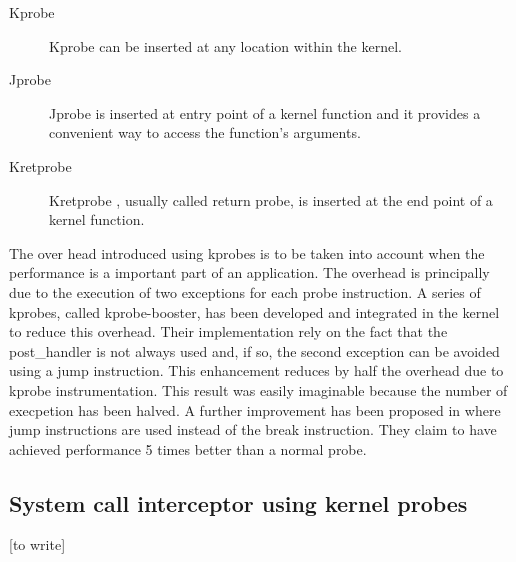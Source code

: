 \begin{description}
\item[Kprobe] Kprobe can be inserted at any location within the kernel. 
\item[Jprobe] Jprobe is inserted at entry point of a kernel function and it provides a  convenient way to access the function's arguments. 
\item[Kretprobe] Kretprobe , usually called return probe, is inserted at the end point of a kernel function.  
\end{description}
The over head introduced using kprobes is to be taken into account when the performance is a important part of an application. The overhead is principally due to the execution of two exceptions for each probe instruction. A series of kprobes, called kprobe-booster, has been developed and integrated in the kernel to reduce this overhead. Their implementation rely on the fact that the post\_handler is not always used and, if so,  the second exception can be avoided using a jump instruction. This enhancement reduces by half the overhead due to kprobe instrumentation. This result was easily imaginable because the number of execpetion has been halved. A further improvement has been proposed in \citep{Djprobe:2007} where jump instructions are used instead of the break instruction. They claim to have achieved performance 5 times better than a normal probe.   

\subsection{System call interceptor using kernel probes}

[to write]

